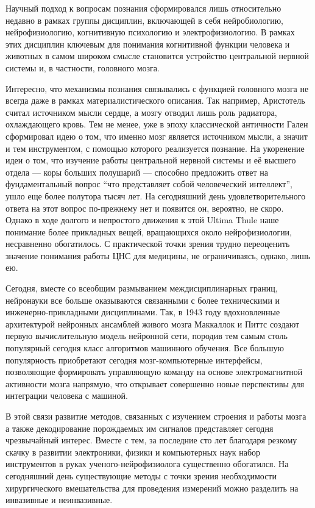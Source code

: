 Научный подход к вопросам познания сформировался лишь относительно недавно в рамках группы
дисциплин, включающей в себя нейробиологию, нейрофизиологию, когнитивную психологию и 
электрофизиологию. В рамках этих дисциплин ключевым для понимания когнитивной функции человека
и животных в самом широком смысле становится устройство центральной нервной системы и, в частности,
головного мозга.

Интересно, что механизмы познания связывались с функцией головного мозга не всегда даже
в рамках материалистического описания. Так например, Аристотель считал источником мысли сердце,
а мозгу отводил лишь роль радиатора, охлаждающего кровь. Тем не менее, уже в эпоху классической
античности Гален сформировал идею о том, что именно мозг является источником мысли,
а значит и тем инструментом, с помощью которого реализуется познание.
На укоренение идеи о том, что изучение работы центральной нервной системы и её высшего отдела
--- коры больших полушарий --- способно предложить ответ на фундаментальный вопрос
“что представляет собой человеческий интеллект”, ушло еще более полутора тысяч лет. 
На сегодняшний день удовлетворительного ответа на этот вопрос по-прежнему нет и появится он,
вероятно, не скоро. Однако в ходе  долгого и непростого движения к этой Ultima Thule
наше понимание более прикладных вещей, вращающихся около нейрофизиологии, несравненно обогатилось.
С практической точки зрения трудно переоценить значение понимания работы ЦНС для медицины, не ограничиваясь, однако, лишь ею. 

Сегодня, вместе со всеобщим размыванием междисциплинарных границ, нейронауки все больше оказываются
связанными с более техническими и инженерно-прикладными дисциплинами.
Так, в 1943 году вдохновленные архитектурой нейронных ансамблей живого мозга Маккаллок и Питтс
создают первую вычислительную модель нейронной сети, породив тем самым столь популярный сегодня
класс алгоритмов машинного обучения. Все большую популярность приобретают сегодня мозг-компьютерные интерфейсы,
позволяющие формировать управляющую команду на основе электромагнитной активности мозга напрямую,
что открывает совершенно новые перспективы для интеграции человека с машиной.

В этой связи развитие методов, связанных с изучением строения и работы мозга а также декодирование
порождаемых им сигналов представляет сегодня чрезвычайный интерес.
Вместе с тем, за последние сто лет благодаря резкому скачку в развитии электроники,
физики и компьютерных наук набор инструментов в руках ученого-нейрофизиолога существенно обогатился.
На сегодняшний день существующие методы с точки зрения необходимости хирургического вмешательства
для проведения измерений можно разделить на инвазивные и неинвазивные.

